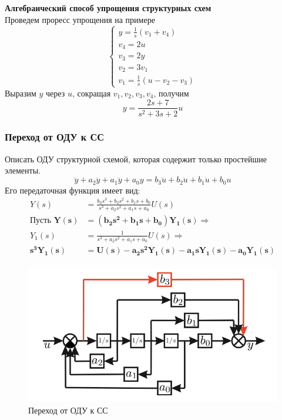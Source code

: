 \documentclass[A4]{article}
\begin{document}
\textbf{Алгебраический способ упрощения структурных схем}\\
Проведем проресс упрощения на примере
\begin{equation}
\left\{\begin{array}{cc}
y=\frac{1}{s}(v_1+v_4)\\
v_4=2u\\
v_3=2y\\
v_2=3v_1\\
v_1=\frac{1}{s}(u-v_2-v_3)
\end{array}\right.
\end{equation}
Выразим $y$ через $u$, сокращая $v_1,v_2,v_3,v_4$, получим
\begin{equation}
y=\frac{2s+7}{s^2+3s+2}u
\end{equation}
\subsubsection{Переход от ОДУ к СС}
Описать ОДУ структурной схемой, которая содержит только простейшие элементы.
\begin{equation}
\dddot{y}+a_2\ddot{y}+a_1\ddot{y}+a_0y=b_3\dddot{u}+b_2\ddot{u}+b_1\dot{u}+b_0u
\end{equation}
Его передаточная функция имеет вид:
\begin{equation}
\begin{aligned}
Y(s)&=\frac{b_3s^3+b_2s^2+b_1s+b_0}{s^3+a_2s^2+a_1s+a_0}U(s)\\
\text{Пусть }\bm{Y(s)}&=\bm{(b_2s^2+b_1s+b_0)Y_1(s)}\Rightarrow\\
Y_1(s)&=\frac{1}{s^3+a_2s^2+a_1s+a_0}U(s)\Rightarrow\\
\bm{s^3Y_1(s)}&=\bm{U(s)-a_2s^2Y_1(s)-a_1sY_1(s)-a_0Y_1(s)}\\
\end{aligned}
\end{equation}
\begin{figure}
	\centering
	\includegraphics[width=0.7\linewidth]{8}
	\caption{Переход от ОДУ к СС}
	\label{fig:8}
\end{figure}
\end{document}
